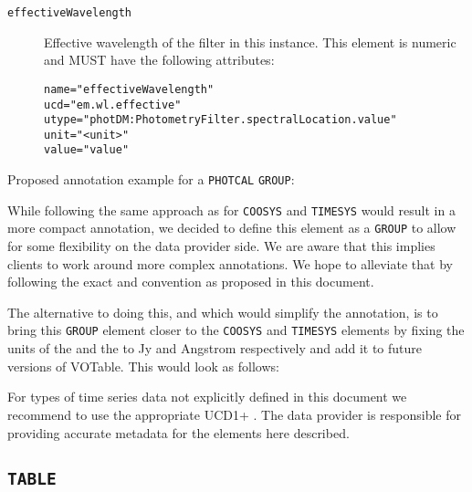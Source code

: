 \documentclass[11pt,a4paper]{ivoa} 
\let\fg=\color
\def\elem#1{{\tt{\fg{DarkRed}#1}}}
\def\attrval#1#2{{\tt{\fg{DarkRed}#1}="{\fg{DarkPurple}#2}"}}
\begin{document}
\begin{description}
\begin{description}
\end{description}
\item[\elem{effectiveWavelength}] Effective wavelength of the filter
  in this instance. This element is numeric and MUST have the following
  attributes:
\begin{description}
    \item[\attrval{name}{effectiveWavelength}]
    \item[\attrval{ucd}{em.wl.effective}]
    \item[\attrval{utype}{photDM:PhotometryFilter.spectralLocation.value}]
    \item[\attrval{unit}{<unit>}]
    \item[\attrval{value}{value}]
\end{description}
\end{description}

Proposed annotation example for a \texttt{PHOTCAL} \elem{GROUP}:



While following the same approach as for \elem{COOSYS} and
\elem{TIMESYS} would result in a more compact annotation, we decided
to define this element as a \elem{GROUP} to allow for some flexibility
on the data provider side. We are aware that this implies clients to
work around more complex annotations. We hope to alleviate that by
following the exact  and  convention as
proposed in this document.

The alternative to doing this, and which would simplify the
annotation, is to bring this \elem{GROUP} element closer to the
\elem{COOSYS} and \elem{TIMESYS} elements by fixing the units of the
 and the  to Jy and
Angstrom respectively and add it to future versions of VOTable. This
would look as follows:




%

For types of time series data not explicitly defined in this document
we recommend to use the appropriate UCD1+
\citep{2005ivoa.spec.0819D}. The data provider is responsible for
providing accurate metadata for the elements here described.


%
\subsection{\elem{TABLE}}
\end{document}
